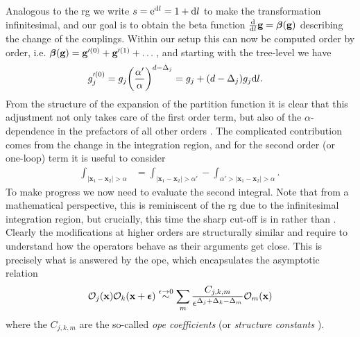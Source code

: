Analogous to the \tms{} \gls{rg} we write $s=\text{e}^{\text{d} l} = 1 + \text{d} l$ to make the transformation infinitesimal, and our goal is to obtain the beta function $\frac{\text{d}}{\text{d} l} \textbf{g} = \bm{\beta}(\textbf{g})$ describing the change of the couplings.
Within our setup this can now be computed order by order, i.e. $\bm{\beta}(\textbf{g}) = \textbf{g}'^{(0)} + \textbf{g}'^{(1)} + \dots$, and starting with the tree-level we have \cite[]{Fradkin_2013}
\begin{align*}
g_j'^{(0)} &= g_j \kla*{\frac{\alpha'}{\alpha}}^{d-\Delta_j} = g_j + (d - \Delta_j) g_j \d l.
\end{align*}
From the structure of the expansion of the partition function it is clear that this adjustment not only takes care of the first order term, but also of the $\alpha$-dependence in the prefactors of all other orders \cite[]{Cardy_1996}.
The complicated contribution comes from the change in the integration region, and for the second order (or one-loop) term it is useful to consider
\begin{align*}
\int_{|\textbf{x}_1-\textbf{x}_2|>\alpha} &= \int_{|\textbf{x}_1-\textbf{x}_2|>\alpha'} - \int_{\alpha'>|\textbf{x}_1-\textbf{x}_2|>\alpha}.
\end{align*}
To make progress we now need to evaluate the second integral.
Note that from a mathematical perspective, this is reminiscent of the \tms{} \gls{rg} due to the infinitesimal integration region, but crucially, this time the sharp cut-off is in \trspace{} rather than \tpspace{}.\\
Clearly the modifications at higher orders are structurally similar and require to understand how the operators behave as their arguments get close.
This is precisely what is answered by the \gls{ope}, which encapsulates the asymptotic relation
\begin{align}
\mathcal{O}_j(\textbf{\textbf{x}}) \mathcal{O}_k(\textbf{x}+\bm{\epsilon}) \overset{\epsilon\rightarrow 0}{\sim} \sum_m \frac{C_{j,k,m}}{\epsilon^{\Delta_j + \Delta_k - \Delta_m}} \mathcal{O}_m(\textbf{x}) \label{eqn:rg:OPE_def}
\end{align}
where the $C_{j,k,m}$ are the so-called \emph{\gls{ope} coefficients} \cite[]{Cardy_1996} (or \emph{structure constants} \cite[]{Fradkin_2013}). %
